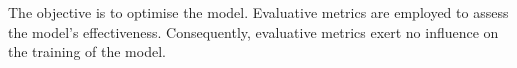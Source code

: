 The objective is to optimise the model. Evaluative metrics are employed to assess the model's effectiveness. Consequently, evaluative metrics exert no influence on the training of the model.